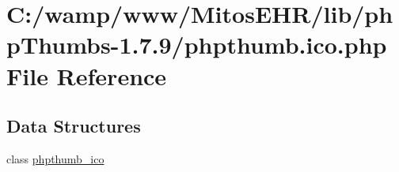 \hypertarget{phpthumb_8ico_8php}{\section{\-C\-:/wamp/www/\-Mitos\-E\-H\-R/lib/php\-Thumbs-\/1.7.9/phpthumb.ico.\-php \-File \-Reference}
\label{phpthumb_8ico_8php}
}
\subsection*{\-Data \-Structures}
\begin{DoxyCompactItemize}
\item 
class \hyperlink{classphpthumb__ico}{phpthumb\-\_\-ico}
\end{DoxyCompactItemize}
